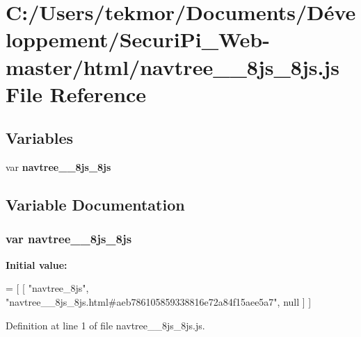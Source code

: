 \section{C\+:/\+Users/tekmor/\+Documents/\+Développement/\+Securi\+Pi\+\_\+\+Web-\/master/html/navtree\+\_\+\+\_\+8js\+\_\+8js.js File Reference}
\label{navtree____8js__8js_8js}
\subsection*{Variables}
\begin{DoxyCompactItemize}
\item 
var {\bf navtree\+\_\+\+\_\+8js\+\_\+8js}
\end{DoxyCompactItemize}


\subsection{Variable Documentation}
\subsubsection[{navtree\+\_\+\+\_\+8js\+\_\+8js}]{\setlength{\rightskip}{0pt plus 5cm}var navtree\+\_\+\+\_\+8js\+\_\+8js}\label{navtree____8js__8js_8js_afec65629753f1f411f088c737f583e73}
{\bfseries Initial value\+:}
\begin{DoxyCode}
=
[
    [ \textcolor{stringliteral}{"navtree\_8js"}, \textcolor{stringliteral}{"navtree\_\_8js\_8js.html#aeb786105859338816e72a84f15aee5a7"}, null ]
]
\end{DoxyCode}


Definition at line 1 of file navtree\+\_\+\+\_\+8js\+\_\+8js.\+js.

